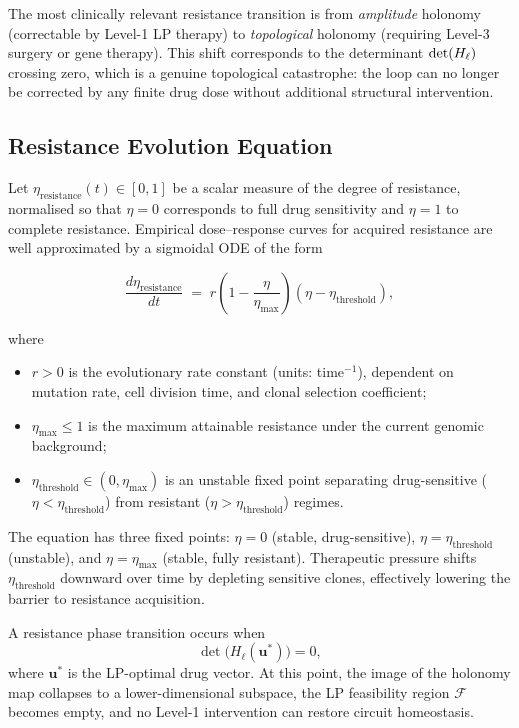 The most clinically relevant resistance transition is from \emph{amplitude}
holonomy (correctable by Level-1 LP therapy) to \emph{topological} holonomy
(requiring Level-3 surgery or gene therapy).  This shift corresponds to the
determinant $\det(H_\ell)$ crossing zero, which is a genuine topological
catastrophe: the loop can no longer be corrected by any finite drug dose without
additional structural intervention.

\subsection{Resistance Evolution Equation}

Let $\eta_{\mathrm{resistance}}(t) \in [0, 1]$ be a scalar measure of the
degree of resistance, normalised so that $\eta = 0$ corresponds to full drug
sensitivity and $\eta = 1$ to complete resistance.  Empirical dose--response
curves for acquired resistance \citep{Goldie1979,Komarova2003} are well
approximated by a sigmoidal ODE of the form

\begin{equation}
  \label{eq:ch10-resistance-ode}
  \frac{d\eta_{\mathrm{resistance}}}{dt}
  \;=\;
  r\left(1 - \frac{\eta}{\eta_{\max}}\right)\!\left(\eta - \eta_{\mathrm{threshold}}\right),
\end{equation}

\noindent where
\begin{itemize}
  \item $r > 0$ is the evolutionary rate constant (units: time$^{-1}$),
        dependent on mutation rate, cell division time, and clonal selection
        coefficient;
  \item $\eta_{\max} \leq 1$ is the maximum attainable resistance under the
        current genomic background;
  \item $\eta_{\mathrm{threshold}} \in (0, \eta_{\max})$ is an unstable fixed
        point separating drug-sensitive ($\eta < \eta_{\mathrm{threshold}}$)
        from resistant ($\eta > \eta_{\mathrm{threshold}}$) regimes.
\end{itemize}

\noindent The equation has three fixed points: $\eta = 0$ (stable,
drug-sensitive), $\eta = \eta_{\mathrm{threshold}}$ (unstable), and $\eta =
\eta_{\max}$ (stable, fully resistant).  Therapeutic pressure shifts
$\eta_{\mathrm{threshold}}$ downward over time by depleting sensitive clones,
effectively lowering the barrier to resistance acquisition.

\begin{proposition}
\label{prop:ch10-resistance-phase}
A resistance phase transition occurs when
\begin{equation}
  \label{eq:ch10-det-zero}
  \det\!\bigl(H_{\ell}(\mathbf{u}^*)\bigr) = 0,
\end{equation}
where $\mathbf{u}^*$ is the LP-optimal drug vector.  At this point, the image
of the holonomy map collapses to a lower-dimensional subspace, the LP
feasibility region $\mathcal{F}$ becomes empty, and no Level-1 intervention can
restore circuit homeostasis.
\end{proposition}

